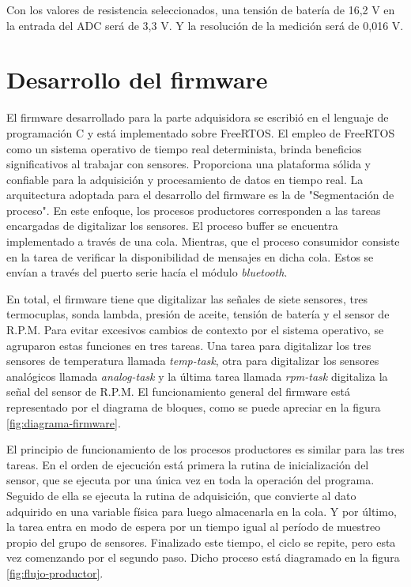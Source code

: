 Con los valores de resistencia seleccionados, una tensión de batería de 16,2 V en la entrada del ADC será de 3,3 V. Y la resolución de la medición será de 0,016 V.

\break

\section{Desarrollo del firmware}

El firmware desarrollado para la parte adquisidora se escribió en el lenguaje de programación C y está implementado sobre FreeRTOS. El empleo de FreeRTOS como un sistema operativo de tiempo real determinista, brinda beneficios significativos al trabajar con sensores. Proporciona una plataforma sólida y confiable para la adquisición y procesamiento de datos en tiempo real. La arquitectura adoptada para el desarrollo del firmware es la de "Segmentación de proceso". En este enfoque, los procesos productores corresponden a las tareas encargadas de digitalizar los sensores. El proceso buffer se encuentra implementado a través de una cola. Mientras, que el proceso consumidor consiste en la tarea de verificar la disponibilidad de mensajes en dicha cola. Estos se envían a través del puerto serie hacía el módulo \textit{bluetooth}.

En total, el firmware tiene que digitalizar las señales de siete sensores, tres termocuplas, sonda lambda, presión de aceite, tensión de batería y el sensor de R.P.M. Para evitar excesivos cambios de contexto por el sistema operativo, se agruparon estas funciones en tres tareas. Una tarea para digitalizar los tres sensores de temperatura llamada \textit{temp-task}, otra para digitalizar los sensores analógicos llamada \textit{analog-task} y la última tarea llamada \textit{rpm-task} digitaliza la señal del sensor de R.P.M. El funcionamiento general del firmware está representado por el diagrama de bloques, como se puede apreciar en la figura \ref{fig:diagrama-firmware}.

El principio de funcionamiento de los procesos productores es similar para las tres tareas. En el orden de ejecución está primera la rutina de inicialización del sensor, que se ejecuta por una única vez en toda la operación del programa. Seguido de ella se ejecuta la rutina de adquisición, que convierte al dato adquirido en una variable física para luego almacenarla en la cola. Y por último, la tarea entra en modo de espera por un tiempo igual al período de muestreo propio del grupo de sensores. Finalizado este tiempo, el ciclo se repite, pero esta vez comenzando por el segundo paso. Dicho proceso está diagramado en la figura \ref{fig:flujo-productor}.

